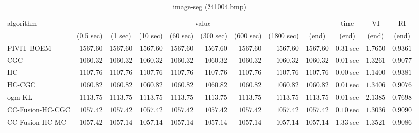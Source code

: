 \begin{table}[H]
\scriptsize
\centering
\caption{image-seg (241004.bmp)}
\label{tab:anytimetable-image-seg-241004.bmp}
\begin{tabular}{lrrrrrrrrrrr}
\toprule
           algorithm &                                   \multicolumn{8}{c}{value} & \multicolumn{1}{c}{time}    & \multicolumn{1}{c}{VI}  & \multicolumn{1}{c}{RI} \\  
\cmidrule(lr){2-9}\cmidrule(lr){10-10} \cmidrule(lr){11-11} \cmidrule(lr){12-12}   
                     & \multicolumn{1}{c}{(0.5 sec)} & \multicolumn{1}{c}{(1 sec)} & \multicolumn{1}{c}{(10 sec)} & \multicolumn{1}{c}{(60 sec)} & \multicolumn{1}{c}{(300 sec)} & \multicolumn{1}{c}{(600 sec)} & \multicolumn{1}{c}{(1800 sec)} & \multicolumn{1}{c}{(end)} & \multicolumn{1}{c}{(end)}    & \multicolumn{1}{c}{(end)}   & \multicolumn{1}{c}{(end)}  \\ \midrule 
          PIVIT-BOEM & $      1567.60$ & $      1567.60$ & $      1567.60$ & $      1567.60$ & $      1567.60$ & $      1567.60$ & $      1567.60$ & $      1567.60$ & $         0.31$ sec    & $       1.7650$  & $       0.9361$ \\ 
                 CGC & $      1060.32$ & $      1060.32$ & $      1060.32$ & $      1060.32$ & $      1060.32$ & $      1060.32$ & $      1060.32$ & $      1060.32$ & $         0.01$ sec    & $       1.3261$  & $       0.9077$ \\ 
                  HC & $      1107.76$ & $      1107.76$ & $      1107.76$ & $      1107.76$ & $      1107.76$ & $      1107.76$ & $      1107.76$ & $      1107.76$ & $         0.00$ sec    & $       1.1400$  & $       0.9381$ \\ 
              HC-CGC & $      1060.82$ & $      1060.82$ & $      1060.82$ & $      1060.82$ & $      1060.82$ & $      1060.82$ & $      1060.82$ & $      1060.82$ & $         0.01$ sec    & $       1.3406$  & $       0.9076$ \\ 
              ogm-KL & $      1113.75$ & $      1113.75$ & $      1113.75$ & $      1113.75$ & $      1113.75$ & $      1113.75$ & $      1113.75$ & $      1113.75$ & $         0.01$ sec    & $       2.1385$  & $       0.7698$ \\ 
    CC-Fusion-HC-CGC & $      1057.42$ & $      1057.42$ & $      1057.42$ & $      1057.42$ & $      1057.42$ & $      1057.42$ & $      1057.42$ & $      1057.42$ & $         0.10$ sec    & $       1.3036$  & $       0.9090$ \\ 
     CC-Fusion-HC-MC & $      1057.42$ & $      1057.14$ & $      1057.14$ & $      1057.14$ & $      1057.14$ & $      1057.14$ & $      1057.14$ & $      1057.14$ & $         1.33$ sec    & $       1.3521$  & $       0.9086$ \\ 

\end{tabular}
\end{table}
